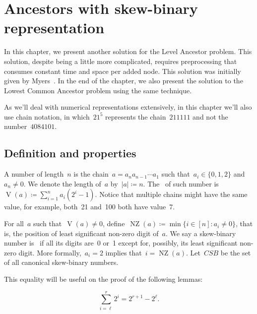 \documentclass[main.tex]{subfiles}
\begin{document}
\providecommand{\Par}{\operatorname{Parent}}
\newcommand{\LA}{\operatorname{LA}}
\newcommand{\Dep}{\operatorname{D}}
\newcommand{\LCA}{\operatorname{LCA}}

\newcommand{\NZ}{\operatorname{NZ}}
\newcommand{\CSB}{\textit{CSB}}
\renewcommand{\V}{\operatorname{V}}
\newcommand{\R}{\operatorname{R}}
\newcommand{\J}{\operatorname{J}}


\chapter{Ancestors with skew-binary representation} \label{cap:skew}

In this chapter, we present another solution for the Level Ancestor problem. This solution, despite being a little more complicated, requires preprocessing that consumes constant time and space per added node. This solution was initially given by Myers~\cite{Myers83}. In the end of the chapter, we also present the solution to the Lowest Common Ancestor problem using the same technique.

As we'll deal with numerical representations extensively, in this chapter we'll also use chain notation, in which~$21^5$ represents the chain~$211111$ and not the number~$4084101$.

\section{Definition and properties}

A  number of length~$n$ is the chain~${a = a_n a_{n-1} \cdots a_1}$ such that~${a_i \in \{0, 1, 2\}}$ and~$a_n \neq 0$. We denote the length of~$a$ by~$|a| \coloneqq n$. The~ of such number is~${\V(a) \coloneqq \sum\limits_{i = 1}^n{a_i (2^i - 1)}}$. Notice that multiple chains might have the same value, for example, both~21 and~100 both have value~7.

For all~$a$ such that~$\V(a) \neq 0$, define~$\NZ(a) \coloneqq \min\{i \in [n] : a_i \neq 0\}$, that is, the position of least significant non-zero digit of~$a$. We say a skew-binary number is~ if all its digits are~0 or~1 except for, possibly, its least significant non-zero digit. More formally,~${a_i = 2}$ implies that~${i = \NZ(a)}$. Let~$\CSB$ be the set of all canonical skew-binary numbers.


This equality will be useful on the proof of the following lemmas:

\begin{equation} \tag{A} \label{eq:sum2}
	\sum\limits_{i = \ell}^r{2^i} = 2^{r+1} - 2^{\ell}.
\end{equation}
\end{document}
